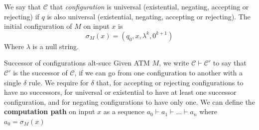We say that $\mathcal{C}$ that \textit{configuration} is universal (existential, negating, accepting or rejecting) if $q$ is also universal
(existential, negating, accepting or rejecting). The initial configuration of $M$ on input $x$ is
$$
    \sigma_M(x) = (q_0, x, \lambda^k, 0^{k+1})
$$
Where $\lambda$ is a null string.

\begin{definitionbox}{Successor of configurations \cite{chandra1981alternation}}{alt-succ}
    Given ATM $M$, we write $\mathcal{C} \vdash \mathcal{C'}$ to say that $\mathcal{C'}$ is the successor of
    $\mathcal{C}$, if we can go from one configuration to another with a single $\delta$ rule.
    We require for $\delta$ that, for accepting or rejecting configurations to have no successors,
    for universal or existential to have at least one successor configuration, and for negating configurations to have only one.
    We can define the \textbf{computation path} on input $x$ as a sequence
    $a_0 \vdash a_1 \vdash ... \vdash a_n$ where $a_0 = \sigma_M(x)$
\end{definitionbox}

